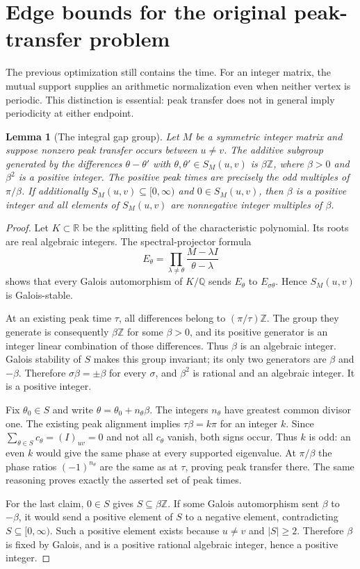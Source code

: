 \documentclass[11pt,a4paper]{article}
\newtheorem{lemma}{Lemma}[section]
\theoremstyle{definition}\newtheorem{definition}[lemma]{Definition}
\theoremstyle{remark}\newtheorem{remark}[lemma]{Remark}
\begin{document}
\section{Edge bounds for the original peak-transfer problem}
\label{sec:peak-edges}

The previous optimization still contains the time. For an integer matrix,
the mutual support supplies an arithmetic normalization even when neither
vertex is periodic. This distinction is essential: peak transfer does not
in general imply periodicity at either endpoint.

\begin{lemma}[The integral gap group]\label{lem:integral-gap-group}
Let $M$ be a symmetric integer matrix and suppose nonzero peak transfer
occurs between $u\ne v$. The additive subgroup generated by the differences
$\theta-\theta'$ with $\theta,\theta'\in S_M(u,v)$ is
$\beta\mathbb Z$, where $\beta>0$ and $\beta^2$ is a positive integer.
The positive peak times are precisely the odd multiples of $\pi/\beta$.
If additionally $S_M(u,v)\subseteq[0,\infty)$ and $0\in S_M(u,v)$,
then $\beta$ is a positive integer and all elements of $S_M(u,v)$ are
nonnegative integer multiples of $\beta$.
\end{lemma}
\begin{proof}
Let $K\subset\mathbb R$ be the splitting field of the characteristic
polynomial. Its roots are real algebraic integers. The spectral-projector
formula
\[
 E_\theta=\prod_{\lambda\ne\theta}
                 \frac{M-\lambda I}{\theta-\lambda}
\]
shows that every Galois automorphism of $K/\mathbb Q$ sends $E_\theta$
to $E_{\sigma\theta}$. Hence $S_M(u,v)$ is Galois-stable.

At an existing peak time $\tau$, all differences belong to
$(\pi/\tau)\mathbb Z$. The group they generate is consequently
$\beta\mathbb Z$ for some $\beta>0$, and its positive generator is an
integer linear combination of those differences. Thus $\beta$ is an
algebraic integer. Galois stability of $S$ makes this group invariant;
its only two generators are $\beta$ and $-\beta$. Therefore
$\sigma\beta=\pm\beta$ for every $\sigma$, and $\beta^2$ is rational
and an algebraic integer. It is a positive integer.

Fix $\theta_0\in S$ and write $\theta=\theta_0+n_\theta\beta$.
The integers $n_\theta$ have greatest common divisor one. The existing
peak alignment implies $\tau\beta=k\pi$ for an integer $k$. Since
$\sum_{\theta\in S}c_\theta=(I)_{uv}=0$ and not all $c_\theta$ vanish,
both signs occur. Thus $k$ is odd: an even $k$ would give the same phase
at every supported eigenvalue. At $\pi/\beta$ the phase ratios
$(-1)^{n_\theta}$ are the same as at $\tau$, proving peak transfer there.
The same reasoning proves exactly the asserted set of peak times.

For the last claim, $0\in S$ gives $S\subseteq\beta\mathbb Z$. If some
Galois automorphism sent $\beta$ to $-\beta$, it would send a positive
element of $S$ to a negative element, contradicting $S\subseteq[0,\infty)$.
Such a positive element exists because $u\ne v$ and $|S|\geq2$.
Therefore $\beta$ is fixed by Galois, and is a positive rational algebraic
integer, hence a positive integer.
\end{proof}
\end{document}
